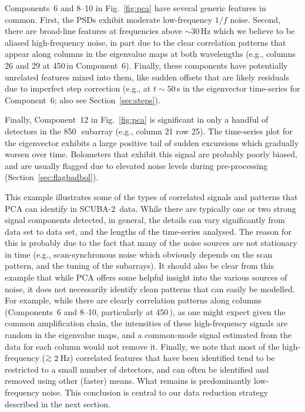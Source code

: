 \documentclass[useAMS,usenatbib,nofootinbib]{mn2e}
\newcommand{\scuba}{SCUBA-2}
\def\gsim{\mathrel{\lower2.5pt\vbox{\lineskip=0pt\baselineskip=0pt
          \hbox{$>$}\hbox{$\sim$}}}}
\begin{document}
Components~6 and 8--10 in Fig.~\ref{fig:pca} have several generic
features in common. First, the PSDs exhibit moderate low-frequency
$1/f$ noise. Second, there are broad-line features at frequencies
above $\sim$30\,Hz which we believe to be aliased high-frequency
noise, in part due to the clear correlation patterns that appear along
columns in the eigenvalue maps at both wavelengths (e.g., columns 26
and 29 at 450\,\micron in Component~6). Finally, these components have
potentially unrelated features mixed into them, like sudden offsets
that are likely residuals due to imperfect step correction (e.g., at
$t\sim50$\,s in the eigenvector time-series for Component~6; also see
Section~\ref{sec:steps}).

Finally, Component~12 in Fig.~\ref{fig:pca} is significant in only a
handful of detectors in the 850\,\micron\ subarray (e.g., column 21
row 25). The time-series plot for the eigenvector exhibits a large
positive tail of sudden excursions which gradually worsen over
time. Bolometers that exhibit this signal are probably poorly biased,
and are usually flagged due to elevated noise levels during
pre-processing (Section~\ref{sec:flagbadbol}).

This example illustrates some of the types of correlated signals and
patterns that PCA can identify in \scuba\ data. While there are
typically one or two strong signal components detected, in general,
the details can vary significantly from data set to data set, and the
lengths of the time-series analysed. The reason for this is probably
due to the fact that many of the noise sources are not stationary in
time (e.g., scan-synchronous noise which obviously depends on the scan
pattern, and the tuning of the subarrays). It should also be clear
from this example that while PCA offers some helpful insight into the
various sources of noise, it does not necessarily identify clean
patterns that can easily be modelled. For example, while there are
clearly correlation patterns along columns (Components~6 and 8--10,
particularly at 450\,\micron), as one might expect given the common
amplification chain, the intensities of these high-frequency signals
are random in the eigenvalue maps, and a common-mode signal estimated
from the data for each column would not remove it. Finally, we note
that most of the high-frequency ($\gsim2$\,Hz) correlated features
that have been identified tend to be restricted to a small number of
detectors, and can often be identified and removed using other
(faster) means. What remains is predominantly low-frequency
noise. This conclusion is central to our data reduction strategy
described in the next section.
\end{document}
